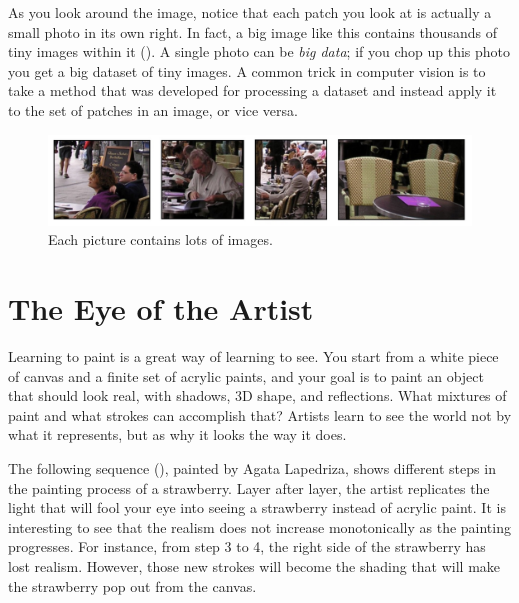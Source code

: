As you look around the image, notice that each patch you look at is actually a small photo in its own right. In fact, a big image like this contains thousands of tiny images within it (\fig{\ref{fig:tiny_images}}). A single photo can be \textit{big data}; if you chop up this photo you get a big dataset of tiny images.
A common trick in computer vision is to take a method that was developed for processing a dataset and instead apply it to the set of patches in an image, or vice versa.


\begin{figure}[t]
\centerline{
    \includegraphics[width=1\linewidth]{figures/visionscience/tiny_images.jpg}
    }
    \caption{Each picture contains lots of images.}
    \label{fig:tiny_images}
\end{figure}



\section{The Eye of the Artist}

Learning to paint is a great way of learning to see. You start from a white piece of canvas and a finite set of acrylic paints, and your goal is to paint an object that should look real, with shadows, 3D shape, and reflections. What mixtures of paint and what strokes can accomplish that? Artists learn to see the world not by what it represents, but as why it looks the way it does. 

The following sequence (\fig{\ref{fig:agata_painting}}), painted by Agata Lapedriza, shows different steps in the painting process of a strawberry. Layer after layer, the artist replicates the light that will fool your eye into seeing a strawberry instead of acrylic paint. It is interesting to see that the realism does not increase monotonically as the painting progresses. For instance, from step 3 to 4, the right side of the strawberry has lost realism. However, those new strokes will become the shading that will make the strawberry pop out from the canvas. 

